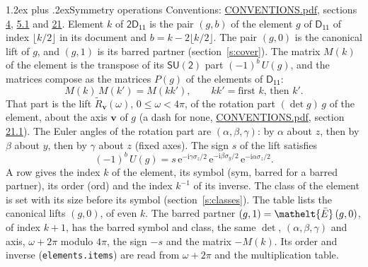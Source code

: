 \documentclass[10pt,a4paper]{article}
\makeatletter
\renewcommand\section{\@startsection{section}{1}{\z@}{-3ex plus -1ex minus -.2ex}%
  {1.2ex plus .2ex}{\normalfont\large\sffamily\bfseries\color{parttitle}}}
\numberwithin{equation}{section}
\newcommand{\eltfont}[1]{{\let\sigma\eltsigma\mathelt{#1}}}
\newcommand{\grp}[1]{\mathsf{#1}}
\newcommand{\elt}[1]{\eltfont{#1}}
\newcommand{\vv}{\mathbf{v}}
\newcommand{\iunit}{\mathrm{i}}
\newcommand{\expe}{\mathrm{e}}
\newcommand{\barred}[1]{\bar{#1}}
\newcommand{\lift}[1]{\tilde{#1}}
\newcommand{\pauli}[1]{\sigma_{#1}}
\makeatother
\begin{document}
\section{Symmetry operations}\label{s:elements}
Conventions: \href{../../CONVENTIONS.pdf}{CONVENTIONS.pdf}, sections \href{../../../rotation/CONVENTIONS.pdf\#conv.4}{4}, \href{../../../rotation/CONVENTIONS.pdf\#conv.5.1}{5.1} and \href{../../CONVENTIONS.pdf\#conv.21}{21}.
\leavevmode\label{n:index.element}\label{n:element.g}Element $k$ of $\grp{2D_{11}}$ is the pair $(g, b)$ of the element $g$ of \href{../../../rotation/data/pdf/D11.pdf}{$\grp{D_{11}}$} of index $\lfloor k/2\rfloor$ in its document and $b = k - 2\lfloor k/2\rfloor$. The pair $(g, 0)$ is the canonical lift of $g$, and $(g, 1)$ is its barred partner (section~\ref{s:cover}). \label{n:matrix.element.pin}\label{n:matrix.element}The matrix $M(k)$ of the element is the transpose of its $\grp{SU(2)}$ part $(-1)^{b}\,U(g)$, and the matrices compose as the matrices $P(g)$ of the elements of $\grp{D_{11}}$:
\begin{equation}\label{e:mprod}M(k)\,M(k') = M(kk'),\qquad kk' = \text{first } k\text{, then } k'.\end{equation}
\leavevmode\label{n:angle.omega}\label{n:vector.axis}\label{n:vector.pole}That part is the lift $\lift{R}_{\vv}(\omega)$, $0 \le \omega < 4\pi$, of the rotation part $(\det g)\,g$ of the element, about the axis $\vv$ of $g$ (a dash for none, \href{../../CONVENTIONS.pdf}{CONVENTIONS.pdf}, section \href{../../CONVENTIONS.pdf\#conv.21.1}{21.1}). \label{n:angle.euler.alpha}\label{n:angle.euler.beta}\label{n:angle.euler.gamma}\label{n:vector.coordinates}The Euler angles of the rotation part are $(\alpha,\beta,\gamma)$: by $\alpha$ about $z$, then by $\beta$ about $y$, then by $\gamma$ about $z$ (fixed axes). \label{n:local.euler.sign}The sign $s$ of the lift satisfies
\begin{equation}\label{e:euler}(-1)^{b}\,U(g) = s\,\expe^{-\iunit\gamma\pauli{z}/2}\,\expe^{-\iunit\beta\pauli{y}/2}\,\expe^{-\iunit\alpha\pauli{z}/2}.\end{equation}
\leavevmode\label{n:index.element.inverse}\label{n:head.sym}\label{n:head.ord}A row gives the index $k$ of the element, its symbol (sym, barred for a barred partner), its order (ord) and the index $k^{-1}$ of its inverse. \label{n:head.class}The class of the element is set with its size before its symbol (section~\ref{s:classes}).
The table lists the canonical lifts $(g, 0)$, of even $k$. The barred partner $(g, 1) = \elt{\barred{E}}\,(g, 0)$, of index $k + 1$, has the barred symbol and class, the same $\det$, $(\alpha,\beta,\gamma)$ and axis, $\omega + 2\pi$ modulo $4\pi$, the sign $-s$ and the matrix $-M(k)$. Its order and inverse (\texttt{elements.items}) are read from $\omega + 2\pi$ and the multiplication table.
\end{document}
